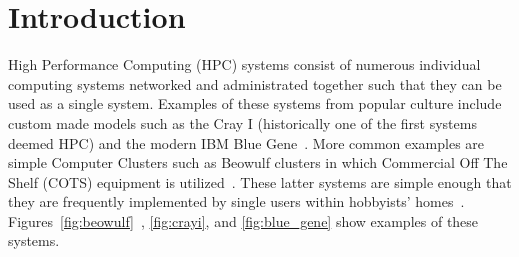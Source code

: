 \documentclass[oneside,12pt]{memoir}
\begin{document}
\tableofcontents

\listoffigures

\mainmatter
\pagestyle{asu} 

\chapter{Introduction}
High Performance Computing (HPC) systems consist of numerous individual computing systems networked and administrated together such that they can be used as a single system. Examples of these systems from popular culture include custom made models such as the Cray I (historically one of the first systems deemed HPC) and the modern IBM Blue Gene~\cite{leavitt2012big}. More common examples are simple Computer Clusters such as Beowulf clusters in which Commercial Off The Shelf (COTS) equipment is utilized~\cite{buyya1999high}. These latter systems are simple enough that they are frequently implemented by single users within hobbyists' homes~\cite{brown2004engineering}. Figures~\ref{fig:beowulf}~, \ref{fig:crayi}, and \ref{fig:blue_gene} show examples of these systems.
\end{document}
